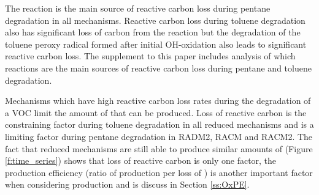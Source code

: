 The  reaction is the main source of reactive carbon loss during pentane degradation in all mechanisms.
Reactive carbon loss during toluene degradation also has significant loss of carbon from the  reaction but the degradation of the toluene peroxy radical formed after initial OH-oxidation also leads to significant reactive carbon loss.
The supplement to this paper includes analysis of which reactions are the main sources of reactive carbon loss during pentane and toluene degradation.

Mechanisms which have high reactive carbon loss rates during the degradation of a VOC limit the amount of  that can be produced.
Loss of reactive carbon is the constraining factor during toluene degradation in all reduced mechanisms and is a limiting factor during pentane degradation in RADM2, RACM and RACM2.
The fact that reduced mechanisms are still able to produce similar amounts of  (Figure \ref{f:time_series}) shows that loss of reactive carbon is only one factor, the  production efficiency (ratio of  production per loss of ) is another important factor when considering  production and is discuss in Section \ref{ss:OxPE}.

